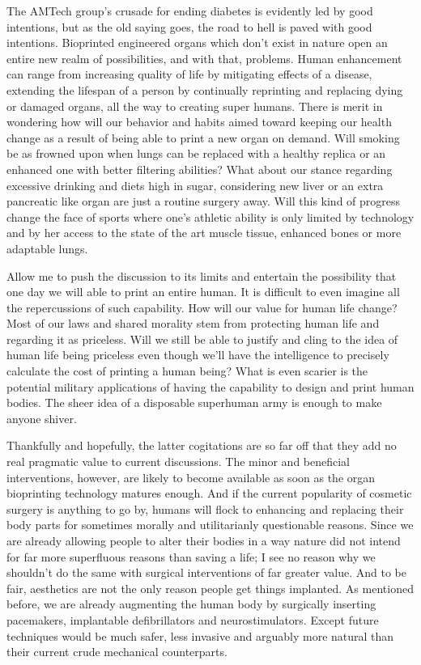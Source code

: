 \documentclass[12pt]{article} %
\begin{document}
The AMTech group's crusade for ending diabetes is evidently led by good intentions, but as the old saying goes, the road to hell is paved with good intentions. Bioprinted engineered organs which don't exist in nature open an entire new realm of possibilities, and with that, problems. 
Human enhancement can range from increasing quality of life by mitigating effects of a disease, extending the lifespan of a person by continually reprinting and replacing dying or damaged organs, all the way to creating super humans. There is merit in wondering how will our behavior and habits aimed toward keeping our health change as a result of being able to print a new organ on demand. Will smoking be as frowned upon when lungs can be replaced with a healthy replica or an enhanced one with better filtering abilities? What about our stance regarding excessive drinking and diets high in sugar, considering new liver or an extra pancreatic like organ are just a routine surgery away. Will this kind of progress change the face of sports where one's athletic ability is only limited by technology and by her access to the state of the art muscle tissue, enhanced bones or more adaptable lungs.

Allow me to push the discussion to its limits and entertain the possibility that one day we will able to print an entire human. It is difficult to even imagine all the repercussions of such capability. How will our value for human life change? Most of our laws and shared morality stem from protecting human life and regarding it as priceless. Will we still be able to justify and cling to the idea of human life being priceless even though we'll have the intelligence to precisely calculate the cost of printing a human being? What is even scarier is the potential military applications of having the capability to design and print human bodies. The sheer idea of a disposable superhuman army is enough to make anyone shiver.
 
Thankfully and hopefully, the latter cogitations are so far off that they add no real pragmatic value to current discussions. 
The minor and beneficial interventions, however, are likely to become available as soon as the organ bioprinting technology matures enough. And if the current popularity of cosmetic surgery is anything to go by, humans will flock to enhancing and replacing their body parts for sometimes morally and utilitarianly questionable reasons. Since we are already allowing people to alter their bodies in a way nature did not intend for far more superfluous reasons than saving a life; I see no reason why we shouldn't do the same with surgical interventions of far greater value. And to be fair, aesthetics are not the only reason people get things implanted. As mentioned before, we are already augmenting the human body by surgically inserting pacemakers, implantable defibrillators and neurostimulators. Except future techniques would be much safer, less invasive and arguably more natural than their current crude mechanical counterparts.
\end{document}
